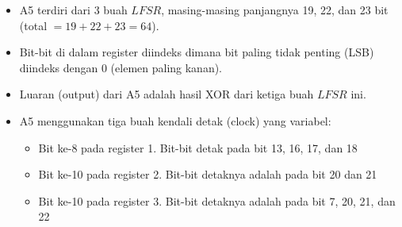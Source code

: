 \documentclass{article}
\begin{document}

\begin{itemize}
    \item A5 terdiri dari 3 buah $LFSR$, masing-masing panjangnya 19, 22, dan 23 bit (total $= 19 + 22 + 23 = 64$).
    \item Bit-bit di dalam register diindeks dimana bit paling tidak penting (LSB) diindeks dengan 0 (elemen paling kanan).
    \item Luaran (output) dari A5 adalah hasil XOR dari ketiga buah $LFSR$ ini.
    \item A5 menggunakan tiga buah kendali detak (clock) yang variabel:
    \begin{itemize}
        \item Bit ke-8 pada register 1. Bit-bit detak pada bit 13, 16, 17, dan 18
        \item Bit ke-10 pada register 2. Bit-bit detaknya adalah pada bit 20 dan 21
        \item Bit ke-10 pada register 3. Bit-bit detaknya adalah pada bit 7, 20, 21, dan 22
    \end{itemize}
\end{itemize}
\end{document}
